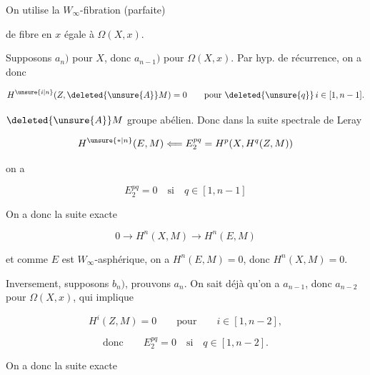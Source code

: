 
On utilise la  $W_\infty$-fibration (parfaite)


de fibre  en $x$ égale à $\Omega(X,x)$.

Supposons $a_n)$ pour $X$, donc $a_{n-1})$ pour $\Omega(X,x)$. Par hyp. de récurrence, on a donc

\[
H^{\unsure{i|n}}(Z,\deleted{\unsure{A}}M)=0\qquad\text{pour }\deleted{\unsure{q}}\,i\in[1,n-1].
\]

$\deleted{\unsure{A}}M$  groupe abélien. Donc dans la suite spectrale de Leray

\[
H^{\unsure{*|n}}(E,M)\Longleftarrow E^{pq}_2=H^p(X,H^q(Z,M))
\]

on a

\[
E^{pq}_2=0\quad\text{si}\quad q\in[1,n-1]
\]


On a donc la suite exacte

\[
0\longrightarrow H^n(X,M)\longrightarrow H^n(E,M)
\]

et comme $E$ est $W_\infty$-asphérique, on a $H^n(E,M)=0$, donc $H^n(X,M)=0$.

Inversement, supposons $b_n)$, prouvons $a_n$. On sait déjà qu'on a $a_{n-1}$, donc $a_{n-2}$ pour $\Omega(X,x)$,  qui implique

\[
H^i(Z,M)=0\qquad\text{pour}\qquad i\in[1,n-2],
\]

\[
\text{donc}\qquad E^{pq}_2=0\quad\text{si}\quad q\in[1,n-2].
\]

On a donc la suite exacte
